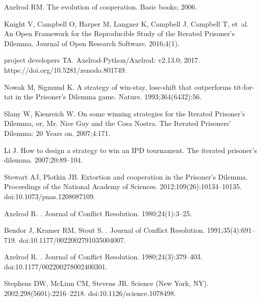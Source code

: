 \documentclass[10pt,letterpaper]{article}
\begin{document}
\begin{thebibliography}{10}

Axelrod RM.
\newblock The evolution of cooperation.
\newblock Basic books; 2006.

Knight V, Campbell O, Harper M, Langner K, Campbell J, Campbell T, et~al.
\newblock An Open Framework for the Reproducible Study of the Iterated
  Prisoner’s Dilemma.
\newblock Journal of Open Research Software. 2016;4(1).

project developers TA. Axelrod-Python/Axelrod: v2.13.0; 2017.
\newblock https://doi.org/10.5281/zenodo.801749.

Nowak M, Sigmund K.
\newblock A strategy of win-stay, lose-shift that outperforms tit-for-tat in
  the Prisoner's Dilemma game.
\newblock Nature. 1993;364(6432):56.

Slany W, Kienreich W.
\newblock On some winning strategies for the Iterated Prisoner’s Dilemma, or,
  Mr. Nice Guy and the Cosa Nostra.
\newblock The Iterated Prisoners' Dilemma: 20 Years on. 2007;4:171.

Li J.
\newblock How to design a strategy to win an IPD tournament.
\newblock The iterated prisoner’s dilemma. 2007;20:89--104.

Stewart AJ, Plotkin JB.
\newblock Extortion and cooperation in the Prisoner’s Dilemma.
\newblock Proceedings of the National Academy of Sciences.
  2012;109(26):10134--10135.
\newblock doi:{10.1073/pnas.1208087109}.

Axelrod R.
.
\newblock Journal of Conflict Resolution. 1980;24(1):3--25.

Bendor J, Kramer RM, Stout S.
.
\newblock Journal of Conflict Resolution. 1991;35(4):691--719.
\newblock doi:{10.1177/0022002791035004007}.

Axelrod R.
.
\newblock Journal of Conflict Resolution. 1980;24(3):379--403.
\newblock doi:{10.1177/002200278002400301}.

Stephens DW, McLinn CM, Stevens JR.
\newblock Science (New York, NY). 2002;298(5601):2216--2218.
\newblock doi:{10.1126/science.1078498}.


\end{thebibliography}
\end{document}
